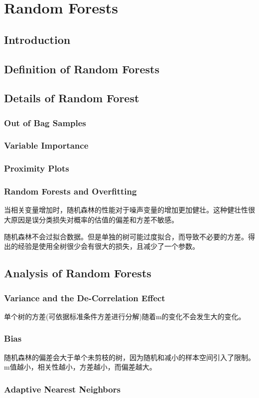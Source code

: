 \chapter{Random Forests}
    \section{Introduction}
    \section{Definition of Random Forests}
    \section{Details of Random Forest}
        \subsection{Out of Bag Samples}
        \subsection{Variable Importance}
        \subsection{Proximity Plots}
        \subsection{Random Forests and Overfitting}
            当相关变量增加时，随机森林的性能对于噪声变量的增加更加健壮。这种健壮性很大原因是误分类损失对概率的估值的偏差和方差不敏感。
            
            随机森林不会过拟合数据。但是单独的树可能过度拟合，而导致不必要的方差。得出的经验是使用全树很少会有很大的损失，且减少了一个参数。
    \section{Analysis of Random Forests}
        \subsection{Variance and the De-Correlation Effect}
            单个树的方差(可依据标准条件方差进行分解)随着m的变化不会发生大的变化。
        \subsection{Bias}
            随机森林的偏差会大于单个未剪枝的树，因为随机和减小的样本空间引入了限制。m值越小，相关性越小，方差越小，而偏差越大。
        \subsection{Adaptive Nearest Neighbors}
